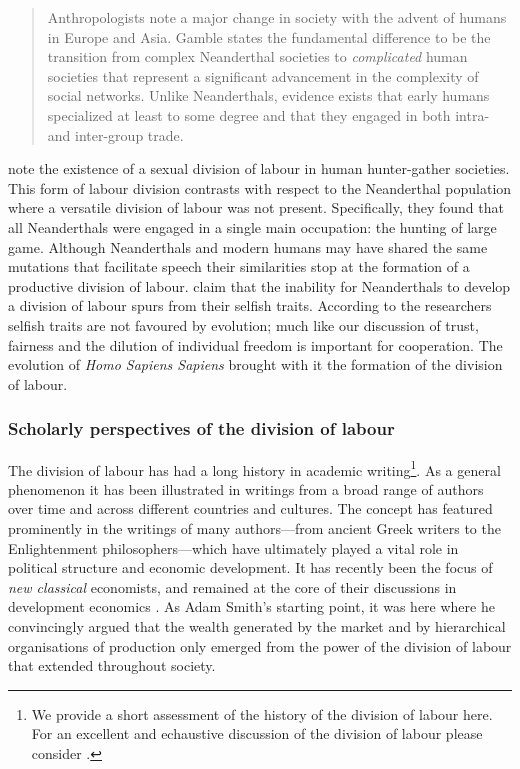 \begin{quote}
Anthropologists note a major change in society with the advent of humans in Europe and Asia. Gamble states the fundamental difference to be the transition from complex Neanderthal societies to \emph{complicated} human societies that represent a significant advancement in the complexity of social networks. Unlike Neanderthals, evidence exists that early humans specialized at least to some degree and that they engaged in both intra- and inter-group trade.

\begin{flushright}
\citet[p.~5]{Horan2005}
\end{flushright}
\end{quote}

\citet{KuhnSteiner2006} note the existence of a sexual division of labour in human hunter-gather societies. This form of labour division contrasts with respect to the Neanderthal population where a versatile division of labour was not present. Specifically, they found that all Neanderthals were engaged in a single main occupation: the hunting of large game. Although Neanderthals and modern humans may have shared the same mutations that facilitate speech their similarities stop at the formation of a productive division of labour. \citet{AdamiHintze2013} claim that the inability for Neanderthals to develop a division of labour spurs from their selfish traits. According to the researchers selfish traits are not favoured by evolution; much like our discussion of trust, fairness and the dilution of individual freedom is important for cooperation. The evolution of \emph{Homo Sapiens Sapiens} brought with it the formation of the division of labour.

\subsubsection{Scholarly perspectives of the division of labour}

The division of labour has had a long history in academic writing\footnote{We provide a short assessment of the history of the division of labour here. For an excellent and echaustive discussion of the division of labour please consider \citet{Sun2012}.}. As a general phenomenon it has been illustrated in writings from a broad range of authors over time and across different countries and cultures. The concept has featured prominently in the writings of many authors---from ancient Greek writers to the Enlightenment philosophers---which have ultimately played a vital role in political structure and economic development. It has recently been the focus of \emph{new classical} economists, and remained at the core of their discussions in development economics \citep{Yang2003}. As Adam Smith's starting point, it was here where he convincingly argued that the wealth generated by the market and by hierarchical organisations of production only emerged from the power of the division of labour that extended throughout society.

